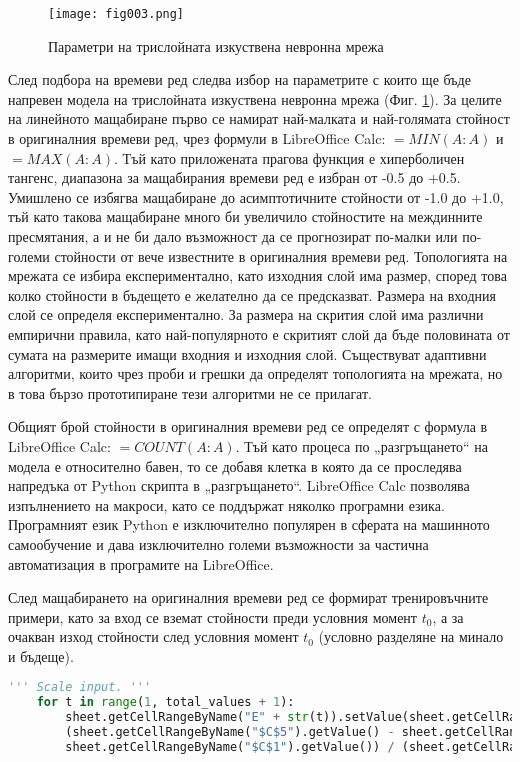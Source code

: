 \begin{figure}[h]
  \centering
  \texttt{[image: fig003.png]}
  \caption{Параметри на трислойната изкуствена невронна мрежа}
\label{fig003}
\end{figure}

След подбора на времеви ред следва избор на параметрите с които ще бъде напревен модела на трислойната изкуствена невронна мрежа (Фиг. \ref{fig003}). За целите на линейното мащабиране първо се намират най-малката и най-голямата стойност в оригиналния времеви ред, чрез формули в LibreOffice Calc: $=MIN(A:A)$ и $=MAX(A:A)$. Тъй като приложената прагова функция е хиперболичен тангенс, диапазона за мащабирания времеви ред е избран от -0.5 до +0.5. Умишлено се избягва мащабиране до асимптотичните стойности от -1.0 до +1.0, тъй като такова мащабиране много би увеличило стойностите на междинните пресмятания, а и не би дало възможност да се прогнозират по-малки или по-големи стойности от вече известните в оригиналния времеви ред. Топологията на мрежата се избира експериментално, като изходния слой има размер, според това колко стойности в бъдещето е желателно да се предсказват. Размера на входния слой се определя експериментално. За размера на скрития слой има различни емпирични правила, като най-популярното е скритият слой да бъде половината от сумата на размерите имащи входния и изходния слой. Съществуват адаптивни алгоритми, които чрез проби и грешки да определят топологията на мрежата, но в това бързо прототипиране тези алгоритми не се прилагат. 

Общият брой стойности в оригиналния времеви ред се определят с формула в LibreOffice Calc: $=COUNT(A:A)$. Тъй като процеса по „разгръщането“ на модела е относително бавен, то се добавя клетка в която да се проследява напредъка от Python скрипта в „разгръщането“. LibreOffice Calc позволява изпълнението на макроси, като се поддържат няколко програмни езика. Програмният език Python е изключително популярен в сферата на машинното самообучение и дава изключително големи възможности за частична автоматизация в програмите на LibreOffice.

След мащабирането на оригиналния времеви ред се формират тренировъчните примери, като за вход се вземат стойности преди условния момент $t_0$, а за очакван изход стойности след условния момент $t_0$ (условно разделяне на минало и бъдеще).

\begin{lstlisting}[caption=Мащабиране на оригиналния времеви ред, language=Python, basicstyle=\tiny, label=listing001]
    ''' Scale input. '''
    for t in range(1, total_values + 1):
        sheet.getCellRangeByName("E" + str(t)).setValue(sheet.getCellRangeByName("$C$4").getValue() + 
        (sheet.getCellRangeByName("$C$5").getValue() - sheet.getCellRangeByName("$C$4").getValue()) * ((sheet.getCellRangeByName("A" + str(t)).getValue() - 
        sheet.getCellRangeByName("$C$1").getValue()) / (sheet.getCellRangeByName("$C$2").getValue() - sheet.getCellRangeByName("$C$1").getValue())))
\end{lstlisting}

